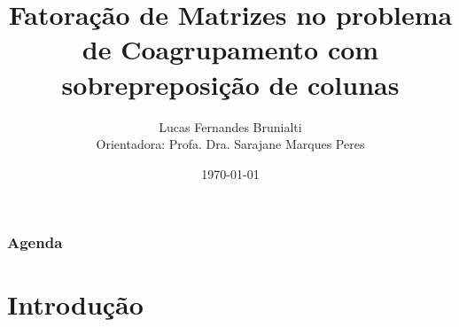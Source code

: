 \documentclass[10pt]{beamer}
\title[FM no problema de Coagrupamento com sobrep. de colunas]{Fatoração de Matrizes no problema de Coagrupamento com sobrepreposição de colunas}
\author{Lucas Fernandes Brunialti \\
\small{Orientadora: Profa. Dra. Sarajane Marques Peres}}
\institute[EACH USP] %
{
Escola de Artes, Ciências e Humanidades \\
Universidade de São Paulo \\ %
\medskip
\textit{lucas.brunialti@usp.br} \\
\textit{sarajane@usp.br}
}
\date{\today} %
\begin{document}
\begin{frame}
\titlepage %
\end{frame}

\begin{frame}
\frametitle{Agenda}
\tableofcontents
\end{frame}



\section{Introdução}

\end{document}

